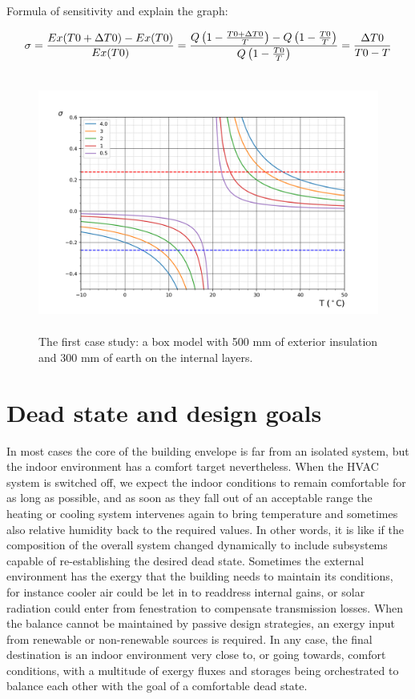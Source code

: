 \documentclass[10pt]{extarticle} %
\begin{document}
Formula of sensitivity and explain the graph:

\begin{equation}
\sigma =  {Ex(T0+\Delta T0)-Ex(T0) \over Ex(T0)} = { { Q \left( 1-{T0+ \Delta T0 \over T} \right) } - { Q \left( 1-{T0 \over T} \right) } \over { Q \left( 1-{T0 \over T} \right) } } = { \Delta T0 \over T0 - T }
\end{equation}

\begin{figure}[h]
 
\includegraphics[height=8.5cm, center]{images/sensitivity.png} 

\caption{The first case study: a box model with 500 mm of exterior  insulation and 300 mm of earth on the internal layers.}
\label{fig:casestudy}
\end{figure}

\vskip3cm

\section{Dead state and design goals}

In most cases the core of the building envelope is far from an isolated system, but the indoor environment has a comfort target nevertheless. When the HVAC system is switched off, we expect the indoor conditions to remain comfortable for as long as possible, and as soon as they fall out of an acceptable range the heating or cooling system intervenes again to bring temperature and sometimes also relative humidity back to the required values. In other words, it is like if the composition of the overall system changed dynamically to include subsystems capable of re-establishing the desired dead state. Sometimes the external environment has the exergy that the building needs to maintain its conditions, for instance cooler air could be let in to readdress internal gains, or solar radiation could enter from fenestration to compensate transmission losses. When the balance cannot be maintained by passive design strategies, an exergy input from renewable or non-renewable sources is required. In any case, the final destination is an indoor environment very close to, or going towards, comfort conditions, with a multitude of exergy fluxes and storages being orchestrated to balance each other with the goal of a comfortable dead state.
\end{document}
